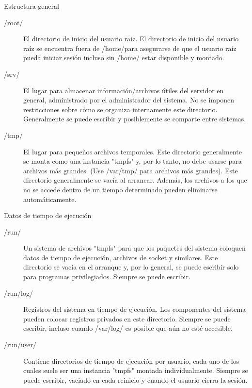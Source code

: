 \begin{frame}[c]{Estructura general}
  \begin{description}
    \item [/root/] El directorio de inicio del usuario raíz. El directorio de
			inicio del usuario raíz se encuentra fuera de /home/para asegurarse de
			que el usuario raíz pueda iniciar sesión incluso sin /home/ estar
			disponible y montado.
    \item [/srv/] El lugar para almacenar información/archivos útiles del
			servidor en general, administrado por el administrador del sistema.
			No se imponen restricciones sobre cómo se organiza internamente este
			directorio. Generalmente se puede escribir y posiblemente se comparte
			entre sistemas.
    \item [/tmp/] El lugar para pequeños archivos temporales. Este directorio
			generalmente se monta como una instancia "tmpfs" y, por lo tanto, no
			debe usarse para archivos más grandes. (Use /var/tmp/ para archivos más
			grandes). Este directorio generalmente se vacía al arrancar. Además, los
			archivos a los que no se accede dentro de un tiempo determinado pueden
			eliminarse automáticamente.
  \end{description}
\end{frame}

\begin{frame}[c]{Datos de tiempo de ejecución}
  \begin{description}
    \item [/run/] Un sistema de archivos "tmpfs" para que los paquetes del
			sistema coloquen datos de tiempo de ejecución, archivos de socket y
			similares. Este directorio se vacía en el arranque y, por lo general,
			se puede escribir solo para programas privilegiados. Siempre se
			puede escribir.
    \item [/run/log/] Registros del sistema en tiempo de ejecución. Los
			componentes del sistema pueden colocar registros privados en este
			directorio. Siempre se puede escribir, incluso cuando /var/log/ es
			posible que aún no esté accesible.
    \item [/run/user/] Contiene directorios de tiempo de ejecución por
			usuario, cada uno de los cuales suele ser una instancia "tmpfs" montada
			individualmente. Siempre se puede escribir, vaciado en cada reinicio y
			cuando el usuario cierra la sesión.
  \end{description}
\end{frame}

